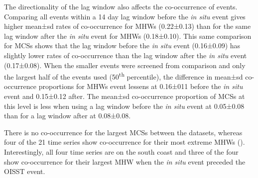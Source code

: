 \documentclass[a4paper,10pt,review]{elsarticle}
\begin{document}
The directionality of the lag window also affects the co-occurrence of events. Comparing all events within a 14 day lag window before the \emph{in situ} event gives higher mean±sd rates of co-occurrence for MHWs (0.22±0.13) than for the same lag window after the \emph{in situ} event for MHWs (0.18±0.10). This same comparison for MCSs shows that the lag window before the \emph{in situ} event (0.16±0.09) has slightly lower rates of co-occurrence than the lag window after the \emph{in situ} event (0.17±0.08). When the smaller events were screened from comparison and only the largest half of the events used (50\textsuperscript{th} percentile), the difference in mean±sd co-occurrence proportions for MHWs event lessens at 0.16±011 before the \emph{in situ} event and 0.15±0.12 after. The mean±sd co-occurrence proportion of MCSs at this level is less when using a lag window before the \emph{in situ} event at 0.05±0.08 than for a lag window after at 0.08±0.08.

There is no co-occurrence for the largest MCSs between the datasets, whereas four of the 21 time series show co-occurrence for their most extreme MHWs (). Interestingly, all four time series are on the south coast and three of the four show co-occurrence for their largest MHW when the \emph{in situ} event preceded the OISST event.
\end{document}
